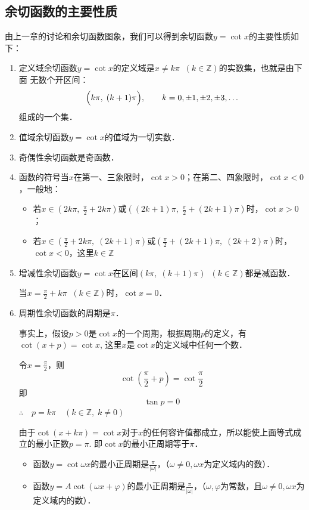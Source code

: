 \subsection{余切函数的主要性质}

由上一章的讨论和余切函数图象，我们可以得到余切函数$y=\cot x$的主要性质如下：
\begin{enumerate}
    \item 定义域\quad 余切函数$y=\cot x$的定义域是$x\ne k\pi\;\;(k\in\mathbb{Z})$的实数集，也就是由下面
无数个开区间：
\[\Bigl(k\pi,\; (k+1)\pi\Bigr), \qquad k=0,\pm1,\pm2,\pm3,\ldots\]
组成的一个集．

\item 值域\quad 余切函数$y=\cot x$的值域为一切实数．
\item 奇偶性\quad 余切函数是奇函数．
\item 函数的符号\quad 当$x$在第一、三象限时，$\cot x>0$；在第二、四象限时，$\cot x<0$，一般地：
\begin{itemize}
    \item 若$x\in\left(2k\pi,\;\frac{\pi}{2}+2k\pi\right)$或$\left((2k+1)\pi,\;\frac{\pi}{2}+(2k+1)\pi\right)$时，$\cot x>0$；
    \item 若$x\in\left(\frac{\pi}{2}+2k\pi,\; (2k+1)\pi\right)$或$\left(\frac{\pi}{2}+(2k+1)\pi,\; (2k+2)\pi\right)$时，$\cot x<0$，这里$k\in\mathbb{Z}$
\end{itemize}

\item 增减性\quad 余切函数$y=\cot x$在区间$(k\pi,\; (k+1)\pi)\;\; (k\in\mathbb{Z})$都是减函数．

当$x=\frac{\pi}{2}+k\pi\;\; (k\in\mathbb{Z})$时，$\cot x=0$．

\item 周期性\quad 余切函数的周期是$\pi$．

事实上，假设$p>0$是$\cot x$的一个周期，根据周期$p$的定义，有$\cot (x+p)=\cot x$, 这里$x$是$\cot x$的定义域中任何一个数．

令$x=\frac{\pi}{2}$，则
\[\cot\left(\frac{\pi}{2}+p\right)=\cot\frac{\pi}{2}\]
即$$\tan p=0$$
$\therefore\quad p=k\pi\quad (k\in\mathbb{Z},\; k\ne 0)$

由于$\cot(x+k\pi)=\cot x$对于$x$的任何容许值都成立，所以能使上面等式成立的最小正数$p=\pi$. 即$\cot x$的最小正周期等于$\pi$．

\begin{itemize}
    \item 函数$y=\cot \omega x$的最小正周期是$\frac{\pi}{|\omega|}$，（$\omega\ne 0, \omega x$为定义域内的数）．
    \item 函数$y=A\cot (\omega x+\varphi)$的最小正周期是$\frac{\pi}{|\omega|}$，（$\omega,\varphi$为常数，且$\omega\ne 0, \omega x$为定义域内的数）．
\end{itemize}


\end{enumerate}
